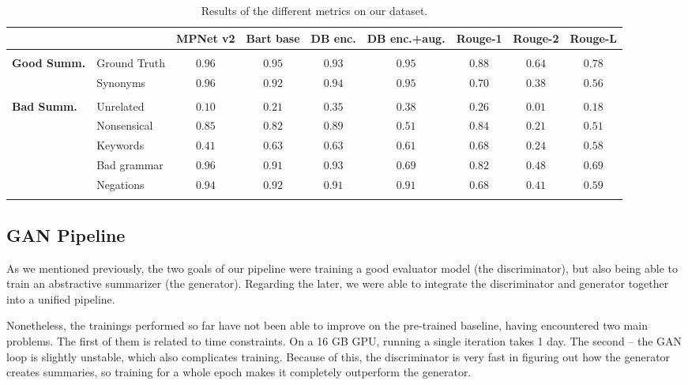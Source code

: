 \documentclass[11pt]{article}
\begin{document}
\begin{table*}
\small
\centering
\begin{tabular}{llccccccc}
\hline
 &  & \textbf{MPNet v2} & \textbf{Bart base}  & \textbf{DB enc.} & \textbf{DB enc.+aug.} & \textbf{Rouge-1} & \textbf{Rouge-2} & \textbf{Rouge-L} \\
\hline
\\
\multirow{2}{*}{\textbf{Good Summ.}} & \multicolumn{1}{|l}{Ground Truth} & $0.96$ & $0.95$ & $0.93$ & $0.95$ & $0.88$ & $0.64$ & $0.78$ \\
		& \multicolumn{1}{|l}{Synonyms} & $0.96$ & $0.92$ & $0.94$ & $0.95$ & $0.70$ & $0.38$ & $0.56$ \\
\\
\multirow{5}{*}{\textbf{Bad Summ.}}	& \multicolumn{1}{|l}{Unrelated} & $0.10$ & $0.21$ & $0.35$ & $0.38$ & $0.26$ & $0.01$ & $0.18$ \\
		& \multicolumn{1}{|l}{Nonsensical} & $0.85$ & $0.82$ & $0.89$ & $0.51$ & $0.84$ & $0.21$ & $0.51$ \\
		& \multicolumn{1}{|l}{Keywords} & $0.41$ & $0.63$ & $0.63$ & $0.61$ & $0.68$ & $0.24$ & $0.58$ \\
		& \multicolumn{1}{|l}{Bad grammar} & $0.96$ & $0.91$ & $0.93$ & $0.69$ & $0.82$ & $0.48$ & $0.69$ \\
		& \multicolumn{1}{|l}{Negations} & $0.94$ & $0.92$ & $0.91$ & $0.91$ & $0.68$ & $0.41$ & $0.59$ \\
\\
\hline
\end{tabular}
\caption{\label{table:ourDatasetResults}
Results of the different metrics on our dataset.
}
\end{table*}

\subsection{GAN Pipeline}

As we mentioned previously, the two goals of our pipeline were training a good evaluator model (the discriminator), but also being able to train an abstractive summarizer (the generator). Regarding the later, we were able to integrate the discriminator and generator together into a unified pipeline.

Nonetheless, the trainings performed so far have not been able to improve on the pre-trained baseline, having encountered two main problems. The first of them is related to time constraints. On a 16 GB GPU, running a single iteration takes 1 day. The second -- the GAN loop is slightly unstable, which also complicates training. Because of this, the discriminator is very fast in figuring out how the generator creates summaries, so training for a whole epoch makes it completely outperform the generator.
\end{document}
